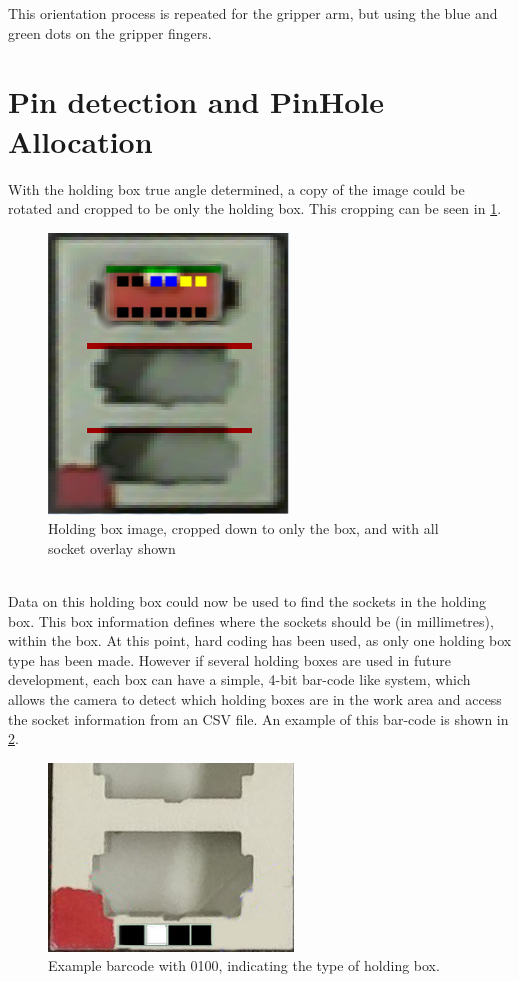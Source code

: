 \documentclass[11pt,a4paper, margin=1in]{report}
\begin{document}
This orientation process is repeated for the gripper arm, but using the blue and green dots on the gripper fingers. 
	
\section{Pin detection and PinHole Allocation}
With the holding box true angle determined, a copy of the image could be rotated and cropped to be only the holding box. This cropping can be seen in \cref{fig:holdingblockwithdata}.
\begin{figure}[h]
	\centering
	\includegraphics[width=0.3\linewidth]{"holding_block_with_data"}
	\caption{Holding box image, cropped down to only the box, and with all socket overlay shown}
	\label{fig:holdingblockwithdata}
\end{figure}\\
Data on this holding box could now be used to find the sockets in the holding box. This box information defines where the sockets should be (in millimetres), within the box. At this point, hard coding has been used, as only one holding box type has been made. However if several holding boxes are used in future development, each box can have a simple, 4-bit bar-code like system, which allows the camera to detect which holding boxes are in the work area and access the socket information from an CSV file. An example of this bar-code is shown in \cref{fig:barcode}.\\
\begin{figure}[h]
\centering
\includegraphics[width=0.3\linewidth]{barcode}
\caption{Example barcode with 0100, indicating the type of holding box.}
\label{fig:barcode}
\end{figure}
\end{document}

